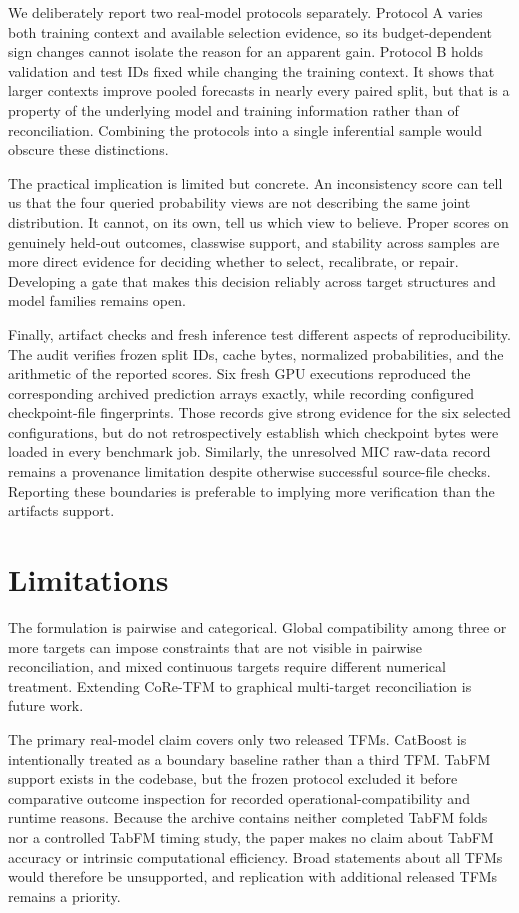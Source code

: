 \documentclass[a4paper,fleqn]{cas-sc}
\begin{document}
We deliberately report two real-model protocols separately. Protocol A varies both training context and available selection evidence, so its budget-dependent sign changes cannot isolate the reason for an apparent gain. Protocol B holds validation and test IDs fixed while changing the training context. It shows that larger contexts improve pooled forecasts in nearly every paired split, but that is a property of the underlying model and training information rather than of reconciliation. Combining the protocols into a single inferential sample would obscure these distinctions.

The practical implication is limited but concrete. An inconsistency score can tell us that the four queried probability views are not describing the same joint distribution. It cannot, on its own, tell us which view to believe. Proper scores on genuinely held-out outcomes, classwise support, and stability across samples are more direct evidence for deciding whether to select, recalibrate, or repair. Developing a gate that makes this decision reliably across target structures and model families remains open.

Finally, artifact checks and fresh inference test different aspects of reproducibility. The audit verifies frozen split IDs, cache bytes, normalized probabilities, and the arithmetic of the reported scores. Six fresh GPU executions reproduced the corresponding archived prediction arrays exactly, while recording configured checkpoint-file fingerprints. Those records give strong evidence for the six selected configurations, but do not retrospectively establish which checkpoint bytes were loaded in every benchmark job. Similarly, the unresolved MIC raw-data record remains a provenance limitation despite otherwise successful source-file checks. Reporting these boundaries is preferable to implying more verification than the artifacts support.

\section{Limitations}
The formulation is pairwise and categorical. Global compatibility among three or more targets can impose constraints that are not visible in pairwise reconciliation, and mixed continuous targets require different numerical treatment. Extending CoRe-TFM to graphical multi-target reconciliation is future work.

The primary real-model claim covers only two released TFMs. CatBoost is intentionally treated as a boundary baseline rather than a third TFM. TabFM support exists in the codebase, but the frozen protocol excluded it before comparative outcome inspection for recorded operational-compatibility and runtime reasons. Because the archive contains neither completed TabFM folds nor a controlled TabFM timing study, the paper makes no claim about TabFM accuracy or intrinsic computational efficiency. Broad statements about all TFMs would therefore be unsupported, and replication with additional released TFMs remains a priority.
\end{document}
